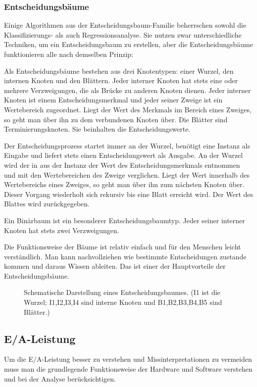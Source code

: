 \subsubsection{Entscheidungsbäume}
Einige Algorithmen aus der Entscheidungsbaum-Familie beherrschen sowohl die Klassifizierungs- als auch Regressionsanalyse. 
Sie nutzen zwar unterschiedliche Techniken, um ein Entscheidungsbaum zu erstellen, aber die Entscheidungsbäume funktionieren alle nach demselben Prinzip: 

Als Entscheidungsbäume bestehen aus drei Knotentypen: einer Wurzel, den internen Knoten und den Blättern. 
Jeder interner Knoten hat stets eine oder mehrere Verzweigungen, die als Brücke zu anderen Knoten dienen. 
Jeder interner Knoten ist einem Entscheidungsmerkmal und jeder seiner Zweige ist ein Wertebereich zugeordnet. 
Liegt der Wert des Merkmals im Bereich eines Zweiges, so geht man über ihn zu dem verbundenen Knoten über. 
Die Blätter sind Terminierungsknoten. 
Sie beinhalten die Entscheidungswerte. 

Der Entscheidungsprozess startet immer an der Wurzel, benötigt eine Instanz als Eingabe und liefert stets einen Entscheidungswert als Ausgabe. 
An der Wurzel wird der in aus der Instanz der Wert des Entscheidungsmerkmals entnommen und mit den Wertebereichen des Zweige verglichen. 
Liegt der Wert innerhalb des Wertebereichs eines Zweiges, so geht man über ihn zum nächsten Knoten über. 
Dieser Vorgang wiederholt sich rekursiv bis eine Blatt erreicht wird. Der Wert des Blattes wird zurückgegeben. 

Ein Binärbaum ist ein besonderer Entscheidungsbaumtyp. 
Jeder seiner interner Knoten hat stets zwei Verzweigungen. 

Die Funktionsweise der Bäume ist relativ einfach und für den Menschen leicht verständlich. 
Man kann nachvollziehen wie bestimmte Entscheidungen zustande kommen und daraus Wissen ableiten. 
Das ist einer der Hauptvorteile der Entscheidungsbäume.


\begin{figure}[h]
	\centering
	
	\label{fig:bas:decision_tree}
	\caption{Schematische Darstellung eines Entscheidungsbaumes. (I1 ist die Wurzel; I1,I2,I3,I4 sind interne Knoten und B1,B2,B3,B4,B5 sind Blätter.)}
\end{figure}


\subsection{E/A-Leistung}
Um die E/A-Leistung besser zu verstehen und Missinterpretationen zu vermeiden muss man die grundlegende Funktionsweise der Hardware und Software verstehen und bei der Analyse berücksichtigen. 

